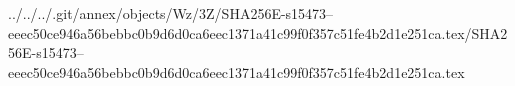 ../../../.git/annex/objects/Wz/3Z/SHA256E-s15473--eeec50ce946a56bebbc0b9d6d0ca6eec1371a41c99f0f357c51fe4b2d1e251ca.tex/SHA256E-s15473--eeec50ce946a56bebbc0b9d6d0ca6eec1371a41c99f0f357c51fe4b2d1e251ca.tex